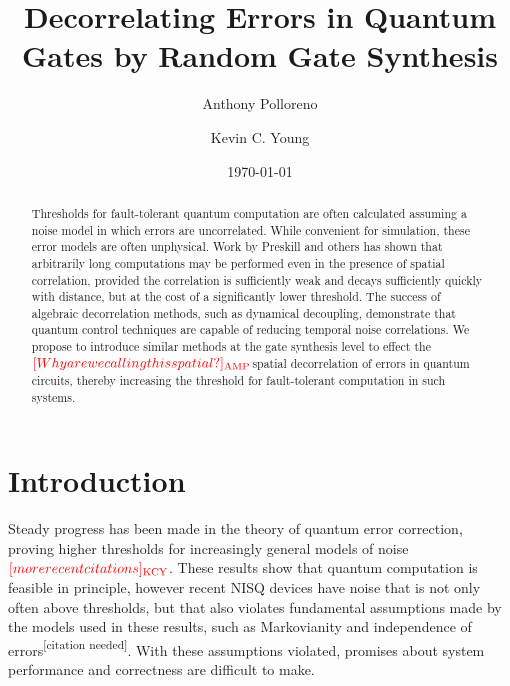 \documentclass[aps,nofootinbib,pra,notitlepage,twocolumn]{revtex4-1}
\newcommand{\needcite}{{\color{blue}\textsuperscript{[citation needed]}}}
\newcommand{\kcy}[1]{{\color{red}[#1]_{\rm{KCY}}}}
\newcommand{\amp}[1]{{\color{red}[#1]_{\rm{AMP}}}}
\begin{document}
\title{Decorrelating Errors in Quantum Gates by Random Gate Synthesis}

\author{Anthony Polloreno}

\author{Kevin C. Young}

\date{\today}

\begin{abstract}
Thresholds for fault-tolerant quantum computation are often calculated assuming a noise model in which errors are uncorrelated. While convenient for simulation, these error models are often unphysical. Work by Preskill and others has shown that arbitrarily long computations may be performed even in the presence of spatial correlation, provided the correlation is sufficiently weak and decays sufficiently quickly with distance, but at the cost of a significantly lower threshold. The success of algebraic decorrelation methods, such as dynamical decoupling, demonstrate that quantum control techniques are capable of reducing temporal noise correlations. We propose to introduce similar methods at the gate synthesis level to effect the $\amp{Why are we calling this spatial?}$spatial decorrelation of errors in quantum circuits, thereby increasing the threshold for fault-tolerant computation in such systems.
\end{abstract}

\pacs{}

\maketitle

\section{Introduction}

Steady progress has been made in the theory of quantum error correction, proving higher thresholds for increasingly general models of noise \cite{Aharonov2006} $\kcy{more recent citations}$. These results show that quantum computation is feasible in principle, however recent NISQ \cite{Preskill2018} devices have noise that is not only often above thresholds, but that also violates fundamental assumptions made by the models used in these results, such as Markovianity \cite{Kitaev1997} and independence of errors\needcite. With these assumptions violated, promises about system performance and correctness are difficult to make.
\end{document}
